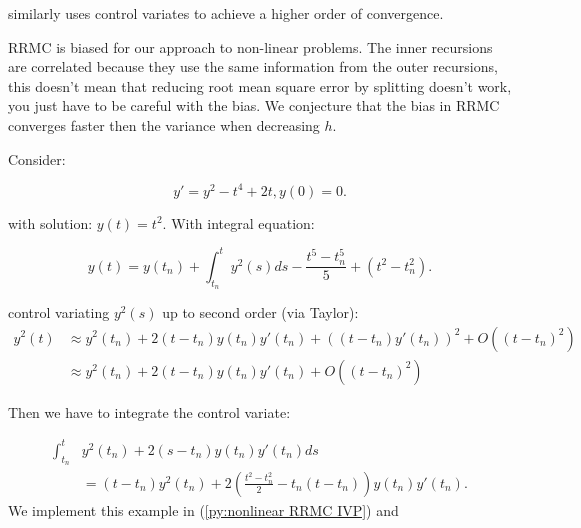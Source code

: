 \documentclass[a4paper,12pt]{article}
\begin{document}
\begin{related}[CV RRMC]
    \cite{daun_randomized_2011} similarly uses control variates to achieve
    a higher order of convergence.
\end{related}

RRMC is biased for our approach to non-linear problems.
The inner recursions are correlated because they use the same
information from the outer recursions, this doesn't mean that reducing
root mean square error by splitting doesn't work, you just have to be careful
with the bias. We conjecture that the bias in RRMC converges faster then the
variance when decreasing $h$.


\begin{example} \label{ex:nonlinear RRMC IVP}
    Consider:

    \begin{equation}
        y' = y^{2} - t^{4} +2t,y(0)=0.
    \end{equation}

    with solution: $y(t)=t^{2}$. With integral equation:

    \begin{equation}
        y(t)= y(t_{n}) + \int_{t_{n}}^{t} y^{2}(s) ds
        - \frac{t^{5}-t_{n}^{5}}{5} +(t^{2}-t_{n}^{2}) .
    \end{equation}

    control variating $y^{2}(s)$ up to second order (via Taylor):
    \begin{align}
        y^{2}(t) & \approx y^{2}(t_{n}) + 2(t-t_{n})y(t_{n})y'(t_{n})
        + ((t-t_{n})y'(t_{n}))^{2} + O((t-t_{n})^{2})                                   \\
                 & \approx y^{2}(t_{n}) + 2(t-t_{n})y(t_{n})y'(t_{n})+ O((t-t_{n})^{2})
    \end{align}

    Then we have to integrate the control variate:

    \begin{align}
        \int_{t_{n}}^{t} & y^{2}(t_{n}) + 2(s-t_{n})y(t_{n})y'(t_{n}) ds \\
                         & = (t-t_{n})y^{2}(t_{n})+
        2\left(\frac{t^{2}-t_{n}^{2}}{2} -t_{n}(t-t_{n}) \right)y(t_{n})y'(t_{n}).
    \end{align}
    We implement this example in (\ref{py:nonlinear RRMC IVP}) and
\end{example}

\begin{pythonn} \label{py:nonlinear RRMC IVP}
\end{pythonn}
\end{document}
